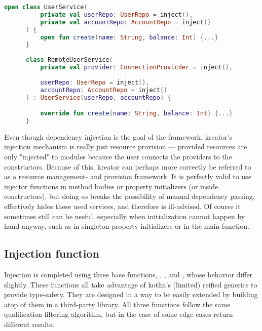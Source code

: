 		\begin{center}
				\begin{minipage}{14cm}
		\begin{lstlisting}[language=Kotlin, title={\code{userService.kt}}]
	  open class UserService(
		  private val userRepo: UserRepo = inject(),
		  private val accountRepo: AccountRepo = inject()
	  ) {
		  open fun create(name: String, balance: Int) {...}
	  }
	  
	  class RemoteUserService(
		  private val provider: ConnectionProvicder = inject(),
		  
		  userRepo: UserRepo = inject(),
		  accountRepo: AccountRepo = inject()
	  ) : UserService(userRepo, accountRepo) {

		  override fun create(name: String, balance: Int) {...}
	  }
		\end{lstlisting}
				\end{minipage}
			\end{center}
	
		Even though dependency injection is the goal of the framework, kreator's injection mechanism is really just resource provision --- provided resources are only "injected" to modules because the user connects the providers to the constructors. Because of this, kreator can perhaps more correctly be referred to as a resource management- and provision framework. It is perfectly valid to use injector functions in method bodies or property initializers (or inside constructors), but doing so breaks the possibility of manual dependency passing, effectively hides these used services, and therefore is ill-advised. Of course it sometimes still can be useful, especially when initialization cannot happen by hand anyway, such as in singleton property initializers or in the main function.
	
		\subsection*{Injection function}
		
		Injection is completed using three base functions, , , and , whose behavior differ slightly. These functions all take advantage of kotlin's (limited) reified generics to provide type-safety. They are designed in a way to be easily extended by building atop of them in a third-party library. All three functions follow the same qualification filtering algorithm, but in the case of some edge cases return different results:
	

